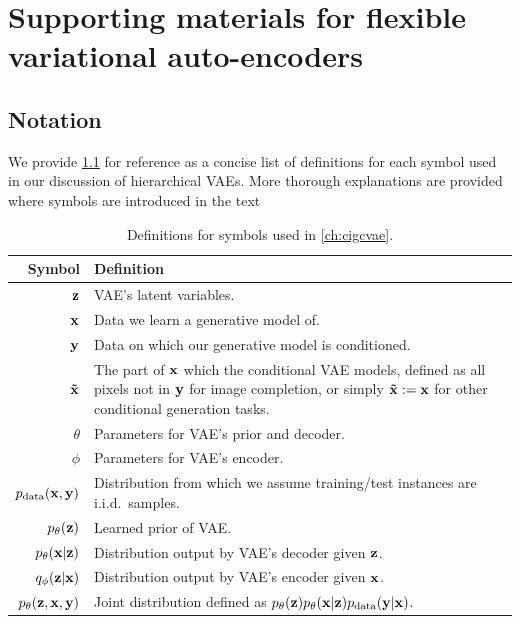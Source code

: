 \chapter{Supporting materials for flexible variational auto-encoders}

\section{Notation}
We provide \cref{tab:cigcvae-notation} for reference as a concise list of definitions
for each symbol used in our discussion of hierarchical VAEs. More thorough explanations are provided where symbols are
introduced in the text

\begin{table}
  \caption{Definitions for symbols used in \cref{ch:cigcvae}.}
  \label{tab:cigcvae-notation}
  \centering
  \begin{tabular}{rp{10cm}}
    \toprule
    Symbol    & Definition   \\
    \midrule
    ${\mathbf{z}}$                                   & VAE's latent variables. \\
    ${\mathbf{x}}$                                & Data we learn a generative model of. \\
    ${\mathbf{y}}$                            & Data on which our generative model is conditioned. \\
    $\mathbf{\tilde{x}}{}$                           & The part of ${\mathbf{x}}$ which the conditional VAE models, defined as all pixels not in ${\mathbf{y}}$ for image completion, or simply $\mathbf{\tilde{x}} := {\mathbf{x}}$ for other conditional generation tasks. \\
    $\theta$                              & Parameters for VAE's prior and decoder. \\
    $\phi$                                & Parameters for VAE's encoder. \\
    $p_{\rm{data}} ({\mathbf{x}}, {\mathbf{y}})$            & Distribution from which we assume training/test instances are i.i.d.~samples. \\
    $p_\theta({\mathbf{z}})$                        & Learned prior of VAE. \\
    $p_\theta({\mathbf{x}}|{\mathbf{z}})$                   & Distribution output by VAE's decoder given ${\mathbf{z}}$. \\
    $q_\phi({\mathbf{z}}|{\mathbf{x}})$                           & Distribution output by VAE's encoder given ${\mathbf{x}}$. \\
    $p_\theta({\mathbf{z}}, {\mathbf{x}}, {\mathbf{y}})$        & Joint distribution defined as $p_\theta({\mathbf{z}})p_\theta({\mathbf{x}}|{\mathbf{z}})p_{\rm{data}} ({\mathbf{y}}|{\mathbf{x}})$. \\

\end{tabular}
\end{table}
